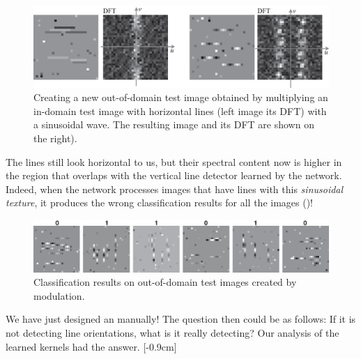 \begin{figure}
\includegraphics[width=1\linewidth]{./figures/convolutional_neural_nets/oriented_bars_cnn_test_adversarial_creation1.eps}
\caption{Creating a new out-of-domain test image obtained by multiplying an in-domain test image with horizontal lines (left image its DFT) with a sinusoidal wave. The resulting image and its DFT are shown on the right).}
\label{fig:convolutional_neural_nets:oriented_bars_cnn_test_adversarial_creation1}
\end{figure}

The lines still look horizontal to us, but their spectral content now is higher in the region that overlaps with the vertical line detector learned by the network. Indeed, when the network processes images that have lines with this {\em sinusoidal texture}, it produces the wrong classification results for all the images (\fig{\ref{fig:convolutional_neural_nets:oriented_bars_cnn_test_adversarial}})!

\begin{figure}
\includegraphics[width=1\linewidth]{./figures/convolutional_neural_nets/oriented_bars_cnn_test_adversarial.eps}
\caption{Classification results on out-of-domain test images created by modulation.}
\label{fig:convolutional_neural_nets:oriented_bars_cnn_test_adversarial}
\end{figure}

We have just designed an  manually! The question then could be as follows: If it is not detecting line orientations, what is it really detecting? Our analysis of the learned kernels had the answer. [-0.9cm]

